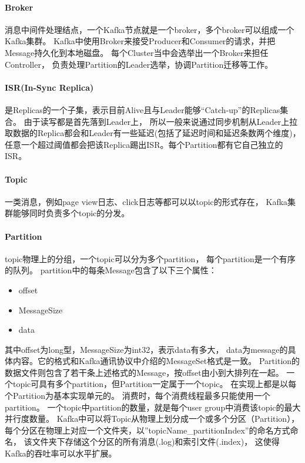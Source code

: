 \documentclass{book}
\begin{document}
\paragraph{Broker}

消息中间件处理结点，一个Kafka节点就是一个broker，多个broker可以组成一个Kafka集群。
Kafka中使用Broker来接受Producer和Consumer的请求，并把Message持久化到本地磁盘。
每个Cluster当中会选举出一个Broker来担任Controller，
负责处理Partition的Leader选举，协调Partition迁移等工作。

\paragraph{ISR(In-Sync Replica)}

是Replicas的一个子集，表示目前Alive且与Leader能够“Catch-up”的Replicas集合。
由于读写都是首先落到Leader上，
所以一般来说通过同步机制从Leader上拉取数据的Replica都会和Leader有一些延迟(包括了延迟时间和延迟条数两个维度)，
任意一个超过阈值都会把该Replica踢出ISR。每个Partition都有它自己独立的ISR。

\paragraph{Topic}

一类消息，例如page view日志、click日志等都可以以topic的形式存在，
Kafka集群能够同时负责多个topic的分发。

\paragraph{Partition}

topic物理上的分组，一个topic可以分为多个partition，
每个partition是一个有序的队列。
partition中的每条Message包含了以下三个属性：

\begin{itemize}
	\item{offset}
	\item{MessageSize}
	\item{data}
\end{itemize}

其中offset为long型，MessageSize为int32，表示data有多大，
data为message的具体内容。它的格式和Kafka通讯协议中介绍的MessageSet格式是一致。
Partition的数据文件则包含了若干条上述格式的Message，按offset由小到大排列在一起。
一个topic可具有多个partition，但Partition一定属于一个topic。
在实现上都是以每个Partition为基本实现单元的。
消费时，每个消费线程最多只能使用一个partition。
一个topic中partition的数量，就是每个user group中消费该topic的最大并行度数量。
Kafka中可以将Topic从物理上划分成一个或多个分区（Partition），
每个分区在物理上对应一个文件夹，以”topicName\_partitionIndex”的命名方式命名，
该文件夹下存储这个分区的所有消息(.log)和索引文件(.index)，
这使得Kafka的吞吐率可以水平扩展。
\end{document}
